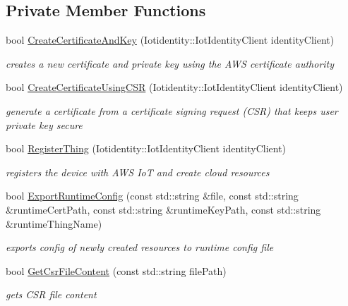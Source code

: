 \subsection*{Private Member Functions}
\begin{DoxyCompactItemize}
\item 
bool \hyperlink{class_aws_1_1_iot_1_1_device_client_1_1_fleet_provisioning_a9be44fae9cf49f534763243561c66586}{Create\+Certificate\+And\+Key} (Iotidentity\+::\+Iot\+Identity\+Client identity\+Client)
\begin{DoxyCompactList}\small\item\em creates a new certificate and private key using the A\+WS certificate authority \end{DoxyCompactList}\item 
bool \hyperlink{class_aws_1_1_iot_1_1_device_client_1_1_fleet_provisioning_a2044a0b21798463dff066fabbb9ad869}{Create\+Certificate\+Using\+C\+SR} (Iotidentity\+::\+Iot\+Identity\+Client identity\+Client)
\begin{DoxyCompactList}\small\item\em generate a certificate from a certificate signing request (C\+SR) that keeps user private key secure \end{DoxyCompactList}\item 
bool \hyperlink{class_aws_1_1_iot_1_1_device_client_1_1_fleet_provisioning_a2221768ad4f91ac5c593485de33c5c80}{Register\+Thing} (Iotidentity\+::\+Iot\+Identity\+Client identity\+Client)
\begin{DoxyCompactList}\small\item\em registers the device with A\+WS IoT and create cloud resources \end{DoxyCompactList}\item 
bool \hyperlink{class_aws_1_1_iot_1_1_device_client_1_1_fleet_provisioning_a6f4e107e4d2858f51603eec2f390aa96}{Export\+Runtime\+Config} (const std\+::string \&file, const std\+::string \&runtime\+Cert\+Path, const std\+::string \&runtime\+Key\+Path, const std\+::string \&runtime\+Thing\+Name)
\begin{DoxyCompactList}\small\item\em exports config of newly created resources to runtime config file \end{DoxyCompactList}\item 
bool \hyperlink{class_aws_1_1_iot_1_1_device_client_1_1_fleet_provisioning_ae209de046ed351b4c8d3ef7e1d9f00bc}{Get\+Csr\+File\+Content} (const std\+::string file\+Path)
\begin{DoxyCompactList}\small\item\em gets C\+SR file content \end{DoxyCompactList}\end{DoxyCompactItemize}
